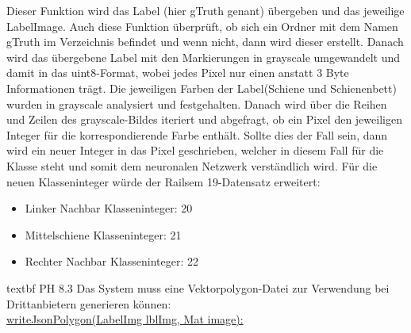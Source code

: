 \noindent
Dieser Funktion wird das Label (hier gTruth genant) übergeben und das jeweilige LabelImage. Auch diese Funktion überprüft, ob sich ein Ordner mit dem Namen gTruth im Verzeichnis befindet und wenn nicht, dann wird dieser erstellt. Danach wird das übergebene Label mit den Markierungen in grayscale umgewandelt und damit in das uint8-Format, wobei jedes Pixel nur einen anstatt 3 Byte Informationen trägt. Die jeweiligen Farben der Label(Schiene und Schienenbett) wurden in grayscale analysiert und festgehalten. Danach wird über die Reihen und Zeilen des grayscale-Bildes iteriert und abgefragt, ob ein Pixel den jeweiligen Integer für die korrespondierende Farbe enthält. Sollte dies der Fall sein, dann wird ein neuer Integer in das Pixel geschrieben, welcher in diesem Fall für die Klasse steht und somit dem neuronalen Netzwerk verständlich wird. Für die neuen Klasseninteger würde der Railsem 19-Datensatz erweitert:
\begin{itemize}
	\item Linker Nachbar Klasseninteger: 20
	\item Mittelschiene Klasseninteger: 21
	\item Rechter Nachbar Klasseninteger: 22
\end{itemize}

\noindent
textbf {PH 8.3 Das System muss eine Vektorpolygon-Datei zur Verwendung bei Drittanbietern generieren können:}
\\

\noindent
\underline{writeJsonPolygon(LabelImg lblImg, Mat image):}
\\

